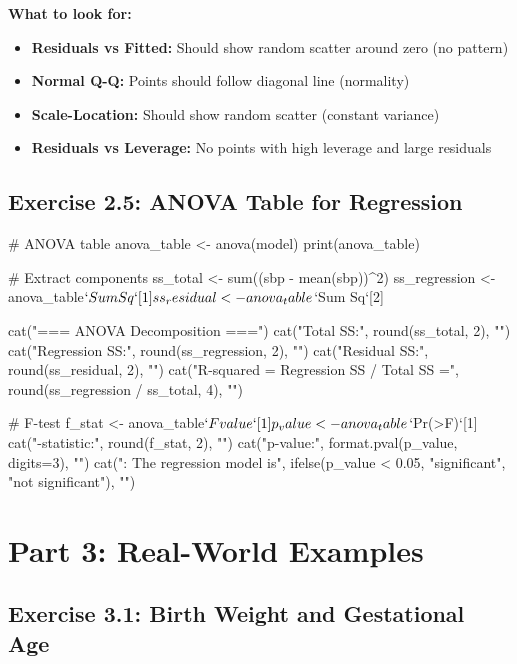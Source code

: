 \documentclass[11pt]{article}
\begin{document}
\textbf{What to look for:}
\begin{itemize}
\item \textbf{Residuals vs Fitted:} Should show random scatter around zero (no pattern)
\item \textbf{Normal Q-Q:} Points should follow diagonal line (normality)
\item \textbf{Scale-Location:} Should show random scatter (constant variance)
\item \textbf{Residuals vs Leverage:} No points with high leverage and large residuals
\end{itemize}

\vspace{0.5cm}

\subsection{Exercise 2.5: ANOVA Table for Regression}

\begin{rcode}
# ANOVA table
anova_table <- anova(model)
print(anova_table)

# Extract components
ss_total <- sum((sbp - mean(sbp))^2)
ss_regression <- anova_table$`Sum Sq`[1]
ss_residual <- anova_table$`Sum Sq`[2]

cat("\n=== ANOVA Decomposition ===\n")
cat("Total SS:", round(ss_total, 2), "\n")
cat("Regression SS:", round(ss_regression, 2), "\n")
cat("Residual SS:", round(ss_residual, 2), "\n")
cat("R-squared = Regression SS / Total SS =",
    round(ss_regression / ss_total, 4), "\n")

# F-test
f_stat <- anova_table$`F value`[1]
p_value <- anova_table$`Pr(>F)`[1]
cat("\nF-statistic:", round(f_stat, 2), "\n")
cat("p-value:", format.pval(p_value, digits=3), "\n")
cat("\nConclusion: The regression model is",
    ifelse(p_value < 0.05, "significant", "not significant"), "\n")
\end{rcode}

\section{Part 3: Real-World Examples}

\subsection{Exercise 3.1: Birth Weight and Gestational Age}
\end{document}
